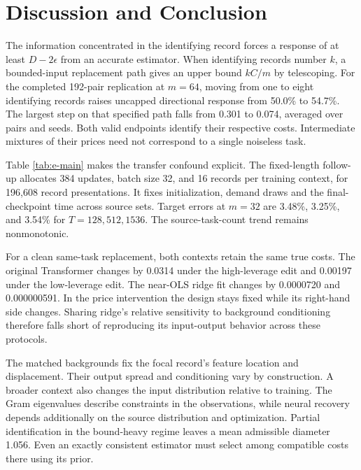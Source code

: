 \documentclass{article}
\newcommand{\pct}[1]{#1\%}
\begin{document}
\section{Discussion and Conclusion}
The information concentrated in the identifying record forces a
response of at least \(D-2\epsilon\) from an accurate estimator.
When identifying records number \(k\), a bounded-input replacement
path gives an upper bound \(kC/m\) by telescoping. For the completed
192-pair replication at \(m=64\), moving from one to eight identifying
records raises uncapped directional response from \pct{50.0} to
\pct{54.7}. The largest step on that specified path falls from
0.301 to 0.074, averaged over pairs and seeds. Both valid endpoints
identify their respective costs. Intermediate mixtures of their
prices need not correspond to a single noiseless task.

Table \ref{tab:e-main} makes the transfer confound explicit.
The fixed-length follow-up allocates 384 updates, batch size 32,
and 16 records per training context, for 196,608 record
presentations. It fixes initialization, demand draws and the
final-checkpoint time across source sets. Target errors at \(m=32\)
are \pct{3.48}, \pct{3.25}, and \pct{3.54} for \(T=128,512,1536\).
The source-task-count trend remains nonmonotonic.

\begin{table}[h]
\caption{E target errors at \(m=32\), in percent. Equal-pass runs
use the listed updates; equal-step runs use 448.}
\label{tab:e-main}
\centering

\end{table}

For a clean same-task replacement, both contexts retain the same
true costs. The original Transformer changes by 0.0314 under the
high-leverage edit and 0.00197 under the low-leverage edit.
The near-OLS ridge fit changes by 0.0000720 and 0.000000591.
In the price intervention the design stays fixed while its
right-hand side changes. Sharing ridge's relative sensitivity to
background conditioning therefore falls short of reproducing its
input-output behavior across these protocols.

The matched backgrounds fix the focal record's feature location
and displacement. Their output spread and conditioning vary by
construction. A broader context also changes the input distribution
relative to training. The Gram eigenvalues describe constraints
in the observations, while neural recovery depends additionally
on the source distribution and optimization. Partial identification
in the bound-heavy regime leaves a mean admissible diameter 1.056.
Even an exactly consistent estimator must select among compatible
costs there using its prior.
\end{document}
